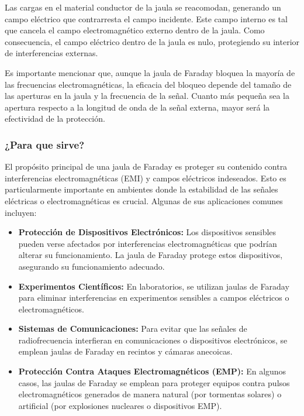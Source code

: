 \documentclass{article}
\begin{document}
    Las cargas en el material conductor de la jaula se reacomodan, generando un campo eléctrico que contrarresta el campo incidente. Este campo interno es tal que cancela el campo electromagnético externo dentro de la jaula. Como consecuencia, el campo eléctrico dentro de la jaula es nulo, protegiendo su interior de interferencias externas.

Es importante mencionar que, aunque la jaula de Faraday bloquea la mayoría de las frecuencias electromagnéticas, la eficacia del bloqueo depende del tamaño de las aperturas en la jaula y la frecuencia de la señal. Cuanto más pequeña sea la apertura respecto a la longitud de onda de la señal externa, mayor será la efectividad de la protección.

\subsubsection{¿Para que sirve?}
El propósito principal de una jaula de Faraday es proteger su contenido contra interferencias electromagnéticas (EMI) y campos eléctricos indeseados. Esto es particularmente importante en ambientes donde la estabilidad de las señales eléctricas o electromagnéticas es crucial. Algunas de sus aplicaciones comunes incluyen:
\begin{itemize}
    \item \textbf{Protección de Dispositivos Electrónicos:} Los dispositivos sensibles pueden verse afectados por interferencias electromagnéticas que podrían alterar su funcionamiento. La jaula de Faraday protege estos dispositivos, asegurando su funcionamiento adecuado.
    \item \textbf{Experimentos Científicos:} En laboratorios, se utilizan jaulas de Faraday para eliminar interferencias en experimentos sensibles a campos eléctricos o electromagnéticos.
    \item \textbf{Sistemas de Comunicaciones:} Para evitar que las señales de radiofrecuencia interfieran en comunicaciones o dispositivos electrónicos, se emplean jaulas de Faraday en recintos y cámaras anecoicas.
    \item \textbf{Protección Contra Ataques Electromagnéticos (EMP):} En algunos casos, las jaulas de Faraday se emplean para proteger equipos contra pulsos electromagnéticos generados de manera natural (por tormentas solares) o artificial (por explosiones nucleares o dispositivos EMP).
\end{itemize}
\end{document}
